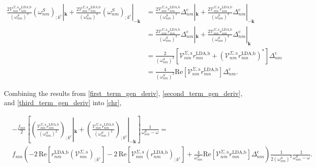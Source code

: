 \documentclass[10pt]{article}
\begin{document}
\begin{align}\label{third_term_gen_deriv}
\frac{2\mathcal{V}^{\Sigma,\text{a}}_{mn}r^{\text{LDA,b}}_{nm}}{(\omega^{S}_{nm})^{3}}\left(\omega^{S}_{nm}\right)_{;k^{\text{c}}}|_{\mathbf{k}} + \frac{2\mathcal{V}^{\Sigma,\text{a}}_{mn}r^{\text{LDA,b}}_{nm}}{(\omega^{S}_{nm})^{3}}\left(\omega^{S}_{nm}\right)_{;k^{\text{c}}}|_{-\mathbf{k}}
&= \frac{2\mathcal{V}^{\Sigma,\text{a}}_{mn}r^{\text{LDA,b}}_{nm}}{(\omega^{S}_{nm})^{3}}\Delta_{nm}^{\text{c}}|_{\mathbf{k}} + \frac{2\mathcal{V}^{\Sigma,\text{a}}_{mn}r^{\text{LDA,b}}_{nm}}{(\omega^{S}_{nm})^{3}}\Delta_{nm}^{\text{c}}|_{-\mathbf{k}}\nonumber\\
&= \frac{2\mathcal{V}^{\Sigma,\text{a}}_{nm}r^{\text{LDA,b}}_{mn}}{(\omega^{S}_{nm})^{3}}\Delta_{nm}^{\text{c}}|_{\mathbf{k}} + \frac{2\mathcal{V}^{\Sigma,\text{a}}_{mn}r^{\text{LDA,b}}_{nm}}{(\omega^{S}_{nm})^{3}}\Delta_{nm}^{\text{c}}|_{\mathbf{k}}\nonumber\\
&= \frac{2}{(\omega^{S}_{nm})^{3}}\left[\mathcal{V}^{\Sigma,\text{a}}_{nm}r^{\text{LDA,b}}_{mn} + \left(\mathcal{V}^{\Sigma,\text{a}}_{nm}r^{\text{LDA,b}}_{mn}\right)^{*}\right]\Delta_{nm}^{\text{c}}\nonumber\\
&= \frac{4}{(\omega^{S}_{nm})^{3}}\mathrm{Re}\left[\mathcal{V}^{\Sigma,\text{a}}_{nm}r^{\text{LDA,b}}_{mn}\right]\Delta_{nm}^{\text{c}}.
\end{align}

Combining the results from \eqref{first_term_gen_deriv}, \eqref{second_term_gen_deriv}, and \eqref{third_term_gen_deriv} into \eqref{chr},

\begin{align}\label{derivative_under_k}
&-\frac{f_{mn}}{2}\left[\left(\frac{\mathcal{V}^{\Sigma,\text{a}}_{mn}r^{\text{LDA,b}}_{nm}}{(\omega^S_{nm})^2}\right)_{;k^{\text{c}}}|_{\mathbf{k}} + \left(\frac{\mathcal{V}^{\Sigma,\text{a}}_{mn}r^{\text{LDA,b}}_{nm}}{(\omega^S_{nm})^2}\right)_{;k^{\text{c}}}|_{-\mathbf{k}}\right]\frac{1}{\omega^S_{nm}-\omega} = \nonumber\\
&f_{mn}\left(-2\,\mathrm{Re}\left[r^{\text{LDA,b}}_{nm}\left(\mathcal{V}^{\Sigma,\text{a}}_{mn}\right)_{;k^{\text{c}}}\right] - 2\,\mathrm{Re}\left[\mathcal{V}^{\Sigma,\text{a}}_{mn}\left(r^{\text{LDA,b}}_{nm}\right)_{;k^{\text{c}}}\right] + \frac{4}{\omega^{S}_{nm}}\mathrm{Re}\left[\mathcal{V}^{\Sigma,\text{a}}_{nm}r^{\text{LDA,b}}_{mn}\right]\Delta_{nm}^{\text{c}}\right)\frac{1}{2(\omega^{S}_{nm})^{2}}\frac{1}{\omega^S_{nm}-\omega}.
\end{align}
\end{document}
